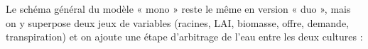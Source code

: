 \documentclass[
]{article}
\newenvironment{Shaded}{\begin{snugshade}}{\end{snugshade}}
\newcommand{\CommentTok}[1]{\textcolor[rgb]{0.56,0.35,0.01}{\textit{#1}}}
\newcommand{\FunctionTok}[1]{\textcolor[rgb]{0.13,0.29,0.53}{\textbf{#1}}}
\newcommand{\NormalTok}[1]{#1}
\newcommand{\OtherTok}[1]{\textcolor[rgb]{0.56,0.35,0.01}{#1}}
\newcommand{\SpecialCharTok}[1]{\textcolor[rgb]{0.81,0.36,0.00}{\textbf{#1}}}
\begin{document}
\begin{Shaded}
\end{Shaded}

Le schéma général du modèle « mono » reste le même en version « duo »,
mais on y superpose deux jeux de variables (racines, LAI, biomasse,
offre, demande, transpiration) et on ajoute une étape d'arbitrage de
l'eau entre les deux cultures :
\end{document}
